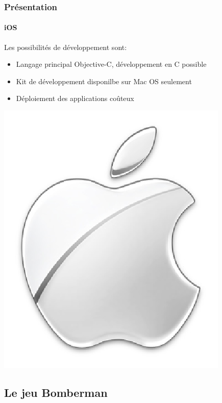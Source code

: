 \begin{frame}
\frametitle{Présentation}
\framesubtitle{iOS}
	\begin{minipage}{8cm}
	Les possibilités de développement sont: \\ 

	\begin{itemize}
		\item Langage principal Objective-C, développement en C possible
		\item Kit de développement disponilbe sur Mac OS seulement
		\item Déploiement des applications coûteux
	\end{itemize}
	\end{minipage}  \includegraphics[scale=0.2]{img/apple.png} 
\end{frame}


 
\subsection{Le jeu Bomberman}



